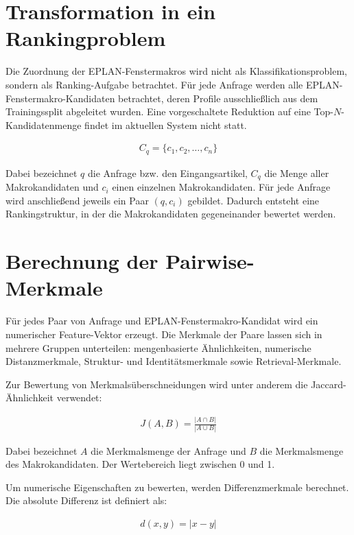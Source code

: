 \section{Transformation in ein Rankingproblem}

Die Zuordnung der EPLAN-Fenstermakros \cite{EPLAN-Makros} wird nicht als Klassifikationsproblem, sondern als Ranking-Aufgabe betrachtet. Für jede Anfrage werden alle EPLAN-Fenstermakro-Kandidaten \cite{EPLAN-Makros} betrachtet, deren Profile ausschließlich aus dem Trainingssplit abgeleitet wurden. Eine vorgeschaltete Reduktion auf eine Top-$N$-Kandidatenmenge findet im aktuellen System nicht statt.

\begin{align}
    C_q = \{c_1,c_2,\dots,c_n\}
\end{align}

Dabei bezeichnet $q$ die Anfrage bzw. den Eingangsartikel, $C_q$ die Menge aller Makrokandidaten und $c_i$ einen einzelnen Makrokandidaten. Für jede Anfrage wird anschließend jeweils ein Paar $(q,c_i)$ gebildet. Dadurch entsteht eine Rankingstruktur, in der die Makrokandidaten gegeneinander bewertet werden.

\section{Berechnung der Pairwise-Merkmale}

Für jedes Paar von Anfrage und EPLAN-Fenstermakro-Kandidat \cite{EPLAN-Makros} wird ein numerischer Feature-Vektor erzeugt. Die Merkmale der Paare lassen sich in mehrere Gruppen unterteilen: mengenbasierte Ähnlichkeiten, numerische Distanzmerkmale, Struktur- und Identitätsmerkmale sowie Retrieval-Merkmale.

Zur Bewertung von Merkmalsüberschneidungen wird unter anderem die Jaccard-Ähnlichkeit verwendet:

\begin{align}
    J(A,B) = \frac{|A \cap B|} {|A \cup B|}
\end{align}

Dabei bezeichnet $A$ die Merkmalsmenge der Anfrage und $B$ die Merkmalsmenge des Makrokandidaten. Der Wertebereich liegt zwischen 0 und 1.

Um numerische Eigenschaften zu bewerten, werden Differenzmerkmale berechnet. Die absolute Differenz ist definiert als:

\begin{align}
    d(x,y) = |x-y|
\end{align}

